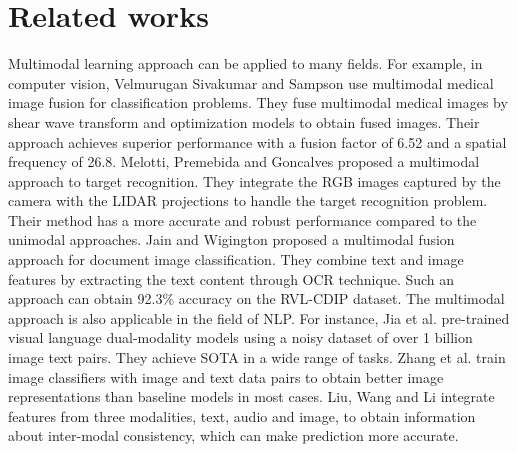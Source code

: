 \documentclass{ecai}
\begin{document}
\section{Related works}


Multimodal learning approach can be applied to many fields. For example, in computer vision, Velmurugan Sivakumar and Sampson \cite{subbiah_parvathy_optimal_2020} use multimodal medical image fusion for classification problems. They fuse multimodal medical images by shear wave transform and optimization models to obtain fused images. Their approach achieves superior performance with a fusion factor of 6.52 and a spatial frequency of 26.8. Melotti, Premebida and Goncalves \cite{melotti_multimodal_2020} proposed a multimodal approach to target recognition. They integrate the RGB images captured by the camera with the LIDAR projections to handle the target recognition problem. Their method has a more accurate and robust performance compared to the unimodal approaches. Jain and Wigington \cite{jain_multimodal_2019} proposed a multimodal fusion approach for document image classification. They combine text and image features by extracting the text content through OCR technique. Such an approach can obtain 92.3\% accuracy on the RVL-CDIP dataset. The multimodal approach is also applicable in the field of NLP. For instance, Jia et al. \cite{jia_scaling_2021} pre-trained visual language dual-modality models using a noisy dataset of over 1 billion image text pairs. They achieve SOTA in a wide range of tasks. Zhang et al. \cite{zhang_contrastive_2022} train image classifiers with image and text data pairs to obtain better image representations than baseline models in most cases. Liu, Wang and Li \cite{liu_towards_2022} integrate features from three modalities, text, audio and image, to obtain information about inter-modal consistency, which can make prediction more accurate.
\end{document}
